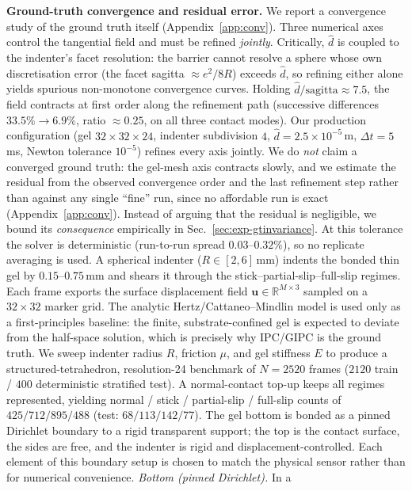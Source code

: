 \documentclass[conference]{IEEEtran}
\begin{document}
\textbf{Ground-truth convergence and residual error.} We report a convergence study
of the ground truth itself (Appendix~\ref{app:conv}). Three numerical axes control
the tangential field and must be refined \emph{jointly}. Critically, $\hat d$ is
coupled to the indenter's facet resolution: the barrier cannot resolve a sphere
whose own discretisation error (the facet sagitta $\approx e^2/8R$) exceeds
$\hat d$, so refining either alone yields spurious non-monotone convergence curves.
Holding $\hat d/\text{sagitta}\approx 7.5$, the field contracts at first order along
the refinement path (successive differences $33.5\%\!\to\!6.9\%$, ratio
$\approx 0.25$, on all three contact modes). Our production configuration
(gel $32\times32\times24$, indenter subdivision $4$, $\hat d=2.5\times10^{-5}$\,m,
$\Delta t=5$\,ms, Newton tolerance $10^{-5}$) refines every axis jointly. We do
\emph{not} claim a converged ground truth: the gel-mesh axis contracts slowly, and
we estimate the residual from the observed convergence order and the last
refinement step rather than against any single ``fine'' run, since no affordable
run is exact (Appendix~\ref{app:conv}). Instead of arguing that the residual is
negligible, we bound its \emph{consequence} empirically in
Sec.~\ref{sec:exp-gtinvariance}. At this tolerance the solver is deterministic
(run-to-run spread $0.03$--$0.32\%$), so no replicate averaging is used.
A spherical indenter
($R\in[2,6]$\,mm) indents the bonded thin gel by $0.15$--$0.75$\,mm and shears it
through the stick--partial-slip--full-slip regimes.
Each frame exports the surface displacement field
$\mathbf{u}\in\mathbb{R}^{M\times3}$ sampled on a $32\times32$ marker grid. The
analytic Hertz/Cattaneo--Mindlin model is used only as a first-principles
baseline: the finite, substrate-confined gel is expected to deviate from the
half-space solution, which is precisely why IPC/GIPC is the ground truth. We sweep
indenter radius $R$, friction $\mu$, and gel stiffness $E$ to produce a
structured-tetrahedron, resolution-24 benchmark of $N{=}2520$ frames ($2120$
train / $400$ deterministic stratified test). A normal-contact top-up keeps all
regimes represented, yielding normal / stick / partial-slip / full-slip counts of
$425/712/895/488$ (test: $68/113/142/77$). The gel bottom is bonded as a pinned
Dirichlet boundary to a rigid transparent support; the top is the contact
surface, the sides are free, and the indenter is rigid and displacement-controlled.
Each element of this boundary setup is chosen to match the physical sensor
rather than for numerical convenience. \emph{Bottom (pinned Dirichlet).} In a
\end{document}
